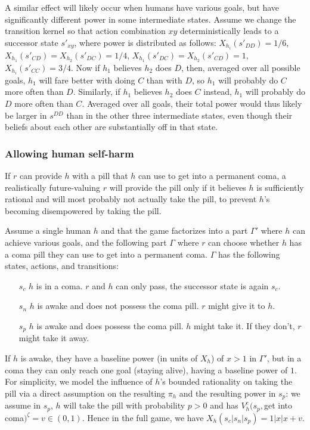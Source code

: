 \documentclass[letterpaper]{article} %
\begin{document}
A similar effect will likely occur when humans have various goals, but have significantly different power in some intermediate states.
Assume we change the transition kernel so that action combination $xy$ deterministically leads to a successor state $s'_{xy}$, where power is distributed as follows:  
$X_{h_i}(s'_{DD})=1/6$,
$X_{h_1}(s'_{CD})=X_{h_2}(s'_{DC})=1/4$,
$X_{h_1}(s'_{DC})=X_{h_2}(s'_{CD})=1$, 
$X_{h_i}(s'_{CC})=3/4$.
Now if $h_1$ believes $h_2$ does $D$, then, averaged over all possible goals, $h_1$ will fare better with doing $C$ than with $D$, so $h_1$ will probably do $C$ more often than $D$.
Similarly, if $h_1$ believes $h_2$ does $C$ instead, $h_1$ will probably do $D$ more often than $C$.
Averaged over all goals, their total power would thus likely be larger in $s^{DD}$ than in the other three intermediate states, even though their beliefs about each other are substantially off in that state.


\subsubsection*{Allowing human self-harm}

If $r$ can provide $h$ with a pill that $h$ can use to get into a permanent coma, a realistically future-valuing $r$ will provide the pill only if it believes $h$ is sufficiently rational and will most probably not actually take the pill, to prevent $h$'s becoming disempowered by taking the pill.

Assume a single human $h$ and that the game factorizes into a part $\Gamma'$ where $h$ can achieve various goals, and the following part $\Gamma$ where $r$ can choose whether $h$ has a coma pill they can use to get into a permanent coma.
$\Gamma$ has the following states, actions, and transitions:
\begin{enumerate}
\item[$s_c$] $h$ is in a coma. $r$ and $h$ can only pass, the successor state is again $s_c$.
\item[$s_n$] $h$ is awake and does not possess the coma pill. $r$ might give it to $h$.
\item[$s_p$] $h$ is awake and does possess the coma pill. $h$ might take it. If they don't, $r$ might take it away.
\end{enumerate}
If $h$ is awake, they have a baseline power (in units of $X_h$) of $x>1$ in $\Gamma'$, but in a coma they can only reach one goal (staying alive), having a baseline power of $1$. 
For simplicity, we model the influence of $h$'s bounded rationality on taking the pill via a direct assumption on the resulting $\pi_h$ and the resulting power in $s_p$: we assume in $s_p$, $h$ will take the pill with probability $p>0$ and has 
$V^e_h(s_p,$get into coma$)^\zeta=v\in(0,1)$.
Hence in the full game, we have $X_h(s_c|s_n|s_p)=1|x|x+v$.
\end{document}
